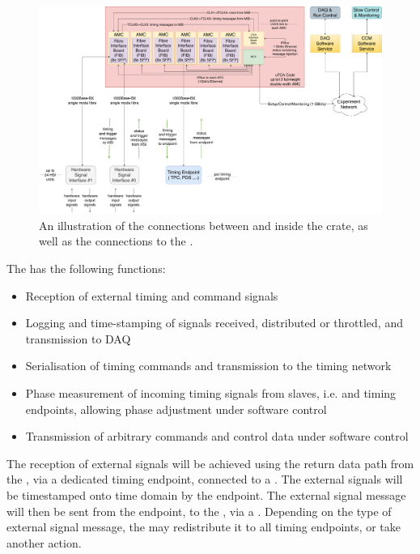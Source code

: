 \documentclass{dune}
\begin{document}
\begin{figure}[h]
\includegraphics[width=\textwidth]{DUNE_SP_Timing_ETL_interface_1apr20.pdf}
\caption{An illustration of the connections between  and  inside the  crate, as well as the connections to the .}
\label{fig:mib_utca_connections}
\end{figure}
The  has the following functions:

\begin{itemize}
	\item Reception of external timing and command signals
	\item Logging and time-stamping of signals received, distributed or throttled, and transmission to DAQ
	\item Serialisation of timing commands and transmission to the timing network
	\item Phase measurement of incoming timing signals from slaves, i.e.  and timing endpoints, allowing phase adjustment under software control
	\item Transmission of arbitrary commands and control data under software control
\end{itemize}

The reception of external signals will be achieved using the return data path from the , via a dedicated timing endpoint, connected to a  . The external signals will be timestamped onto  time domain by the  endpoint. The external signal  message will then be sent from the endpoint, to the , via a . Depending on the type of external signal message, the  may redistribute it to all timing endpoints, or take another action. 
\end{document}
